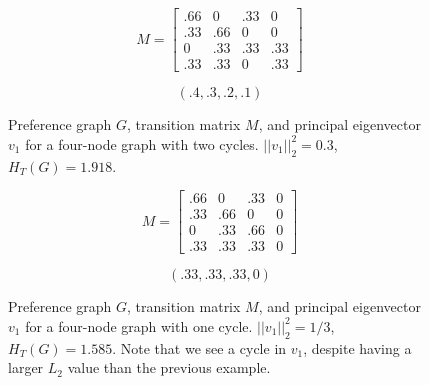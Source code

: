 \begin{figure}[!htb] %
\centering
\begin{minipage}{1.2in}
\end{minipage}
\hfill
\begin{minipage}{1.2in}
\[
M=
  \begin{bmatrix}
    .66 & 0 & .33 & 0 \\
    .33 & .66 & 0 & 0 \\
    0 & .33 & .33 & .33 \\
    .33 & .33 & 0 & .33
  \end{bmatrix}
\]
\end{minipage}
\hfill
\begin{minipage}{1.2in}
\[
(.4, .3, .2, .1)
\]
\end{minipage}
\caption{Preference graph $G$, transition matrix $M$, and principal eigenvector $v_1$ for a four-node graph with two cycles. $||v_1||_2^2 = 0.3$, $H_T(G) = 1.918$.}
\label{fig:linalg_7} 
\end{figure}


\begin{figure}[!htb] %
\centering
\begin{minipage}{1.2in}
\end{minipage}
\hfill
\begin{minipage}{1.2in}
\[
M=
  \begin{bmatrix}
    .66 & 0 & .33 & 0 \\
    .33 & .66 & 0 & 0 \\
    0 & .33 & .66 & 0 \\
    .33 & .33 & .33 & 0
  \end{bmatrix}
\]
\end{minipage}
\hfill
\begin{minipage}{1.2in}
\[
(.33, .33, .33, 0)
\]
\end{minipage}
\caption{Preference graph $G$, transition matrix $M$, and principal eigenvector $v_1$ for a four-node graph with one cycle. $||v_1||_2^2 = 1/3$, $H_T(G) = 1.585$. Note that we see a cycle in $v_1$, despite having a larger $L_2$ value than the previous example.}
\label{fig:linalg_8} 
\end{figure}


